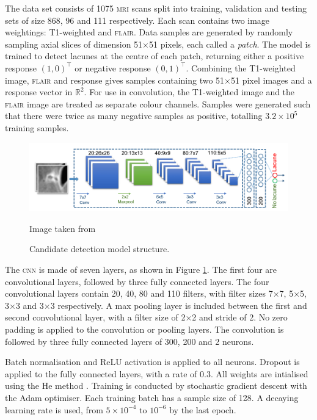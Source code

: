 The data set consists of 1075 \textsc{mri} scans split into training, validation and testing sets of size 868, 96 and 111 respectively. Each scan contains two image weightings: T1-weighted and \textsc{flair}. Data samples are generated by randomly sampling axial slices of dimension 51$\times$51 pixels, each called a \textit{patch}. The model is trained to detect lacunes at the centre of each patch, returning either a positive response $(1, 0)^\intercal$ or negative response $(0, 1)^\intercal$. Combining the T1-weighted image, \textsc{flair} and response gives samples containing two 51$\times$51 pixel images and a response vector in $\mathbb{R}^2$. For use in convolution, the T1-weighted image and the \textsc{flair} image are treated as separate colour channels. Samples were generated such that there were twice as many negative samples as positive, totalling $3.2\times10^5$ training samples.

\begin{figure}[ht]
	\centering
	\includegraphics[width=\textwidth]{Images/5_ghafoorian_model1.png}
	\caption{Candidate detection model structure.}
	\small Image taken from \cite{GhafoorianM.2017Dml3}
	\label{litrev-ghafoorian_model1fig}
\end{figure}

The \textsc{cnn} is made of seven layers, as shown in Figure \ref{litrev-ghafoorian_model1fig}. The first four are convolutional layers, followed by three fully connected layers. The four convolutional layers contain 20, 40, 80 and 110 filters, with filter sizes 7$\times$7, 5$\times$5, 3$\times$3 and 3$\times$3 respectively. A max pooling layer is included between the first and second convolutional layer, with a filter size of 2$\times$2 and stride of 2. No zero padding is applied to the convolution or pooling layers. The convolution is followed by three fully connected layers of 300, 200 and 2 neurons.

Batch normalisation and ReLU activation is applied to all neurons. Dropout is applied to the fully connected layers, with a rate of 0.3. All weights are intialised using the He method \cite{HeKaiming2015DDiR}. Training is conducted by stochastic gradient descent with the Adam optimiser. Each training batch has a sample size of 128. A decaying learning rate is used, from $5\times10^{-4}$ to $10^{-6}$ by the last epoch.

